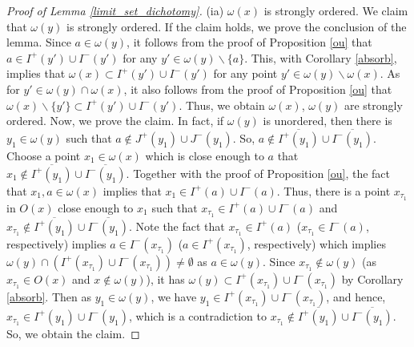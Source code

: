 \documentclass[10pt,a4paper]{amsart}
\begin{document}
\begin{proof}[Proof of Lemma \ref{limit_set_dichotomy}]
    (ia) $\omega(x)$ is strongly ordered. We claim that $\omega(y)$ is strongly ordered. If the claim holds, we prove the conclusion of the lemma. Since $a\in \omega(y)$, it follows from the proof of Proposition \ref{ou} that $a\in I^{+}(y')\cup I^{-}(y')$ for any $y'\in \omega(y)\backslash\{a\}$. 
    This, with Corollary \ref{absorb}, implies that $\omega(x)\subset I^{+}(y')\cup I^{-}(y')$ for any point $y'\in \omega(y)\backslash\omega(x)$. 
    As for $y'\in \omega(y)\cap\omega(x)$, it also follows from the proof of Proposition \ref{ou} that $\omega(x)\backslash \{y'\}\subset I^{+}(y')\cup I^{-}(y')$. 
    Thus, we obtain $\omega(x)$, $\omega(y)$ are strongly ordered. Now, we prove the claim. 
    In fact, if $\omega(y)$ is unordered, then there is $y_1\in \omega(y)$ such that $a\notin J^{+}(y_1)\cup J^{-}(y_1)$. So, $a\notin \overline{I^{+}(y_1)}\cup \overline{I^{-}(y_1)}$.
    Choose a point $x_1\in \omega(x)$ which is close enough to $a$ that $x_1\notin\overline{I^{+}(y_1)}\cup \overline{I^{-}(y_1)}$. 
    Together with the proof of Proposition \ref{ou}, the fact that $x_1,a\in \omega(x)$ implies that $x_1\in I^{+}(a)\cup I^{-}(a)$. 
    Thus, there is a point $x_{\tau_1}$ in $O(x)$ close enough to $x_1$ such that $x_{\tau_1}\in I^{+}(a)\cup I^{-}(a)$ and $x_{\tau_1}\notin\overline{I^{+}(y_1)}\cup \overline{I^{-}(y_1)}$. Note the fact that $x_{\tau_1}\in I^{+}(a)$ ($x_{\tau_1}\in I^{-}(a)$, respectively) implies $a\in I^{-}(x_{\tau_1})$ ($a\in I^{+}(x_{\tau_1})$, respectively) which implies $\omega(y)\cap (I^{+}(x_{\tau_1})\cup I^{-}(x_{\tau_1})) \neq\emptyset$ as $a\in \omega(y)$. Since $x_{\tau_1}\notin\omega(y)$ (as $x_{\tau_1}\in O(x)$ and $x\notin\omega(y)$), it has $\omega(y)\subset I^{+}(x_{\tau_1})\cup I^{-}(x_{\tau_1})$ by Corollary \ref{absorb}. 
    Then as $y_1\in \omega(y)$, we have $y_1\in I^{+}(x_{\tau_1})\cup I^{-}(x_{\tau_1})$, and hence, $x_{\tau_1}\in I^{+}(y_1)\cup I^{-}(y_1)$, which is a contradiction to $x_{\tau_1}\notin\overline{I^{+}(y_1)}\cup \overline{I^{-}(y_1)}$. So, we obtain the claim.
    

\end{proof}
\end{document}
